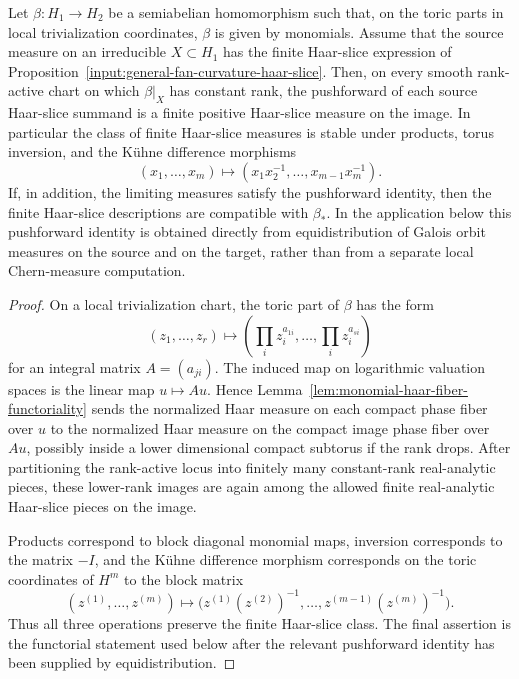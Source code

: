 \documentclass[10pt,a4paper]{amsart}
\theoremstyle{plain}
\theoremstyle{plain}
\numberwithin{equation}{section}
\begin{document}
\begin{prop}
	\label{prop:finite-haar-slice-functoriality}
	Let \(\beta:H_1\to H_2\) be a semiabelian homomorphism such that, on the toric
	parts in local trivialization coordinates, \(\beta\) is given by monomials.
	Assume that the source measure on an irreducible
	\(X\subset H_1\) has the finite Haar-slice expression of
	Proposition~\ref{input:general-fan-curvature-haar-slice}.  Then, on every
	smooth rank-active chart on which \(\beta|_X\) has constant rank, the
	pushforward of each source Haar-slice summand is a finite positive
	Haar-slice measure on the image.  In particular the class of finite
	Haar-slice measures is stable under products, torus inversion, and the
	K\"uhne difference morphisms
	\[
	(x_1,\ldots,x_m)\longmapsto
	(x_1x_2^{-1},\ldots,x_{m-1}x_m^{-1}).
	\]
	If, in addition, the limiting measures satisfy the pushforward identity, then the finite
	Haar-slice descriptions are compatible with \(\beta_*\).  In the application
	below this pushforward identity is obtained directly from equidistribution of
	Galois orbit measures on the source and on the target, rather than from a
	separate local Chern-measure computation.
\end{prop}

\begin{proof}
	On a local trivialization chart, the toric part of \(\beta\) has the form
	\[
	(z_1,\ldots,z_r)\longmapsto
	\left(\prod_i z_i^{a_{1i}},\ldots,\prod_i z_i^{a_{si}}\right)
	\]
	for an integral matrix \(A=(a_{ji})\).  The induced map on logarithmic
	valuation spaces is the linear map \(u\mapsto Au\).  Hence
	Lemma~\ref{lem:monomial-haar-fiber-functoriality} sends the normalized Haar
	measure on each compact phase fiber over \(u\) to the normalized Haar measure
	on the compact image phase fiber over \(Au\), possibly inside a lower
	dimensional compact subtorus if the rank drops.  After partitioning the
	rank-active locus into finitely many constant-rank real-analytic pieces,
	these lower-rank images are again among the allowed finite real-analytic
	Haar-slice pieces on the image.
	
	Products correspond to block diagonal monomial maps, inversion corresponds to
	the matrix \(-I\), and the K\"uhne difference morphism corresponds on the
	toric coordinates of \(H^m\) to the block matrix
	\[
	(z^{(1)},\ldots,z^{(m)})
	\longmapsto
	\bigl(z^{(1)}(z^{(2)})^{-1},\ldots,
	z^{(m-1)}(z^{(m)})^{-1}\bigr).
	\]
	Thus all three operations preserve the finite Haar-slice class.  The final
	assertion is the functorial statement used below after the relevant
	pushforward identity has been supplied by equidistribution.
\end{proof}
\end{document}
